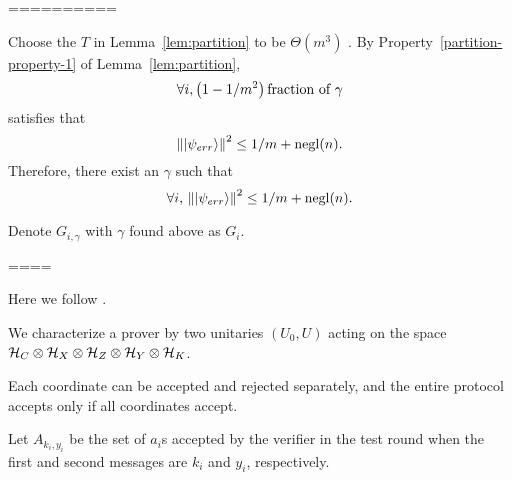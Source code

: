 \fi
==========

Choose the $T$ in Lemma~\ref{lem:partition} to be $\Theta(m^3)$ . By Property~\ref{partition-property-1} of Lemma~\ref{lem:partition}, 
$$\forall i, \left(1- 1/m^2\right)\text{fraction of }\gamma$$ 
satisfies that 
$$\left\lVert\ket{\psi_{err}}\right\rVert^2 \leq 1/m+\operatorname{negl}(n). $$
Therefore, there exist an $\gamma$ such that 
$$\forall i,\, \left\lVert\ket{\psi_{err}}\right\rVert^2 \leq 1/m+\operatorname{negl}(n). $$

Denote $G_{i,\gamma}$ with  $\gamma$ found above as $G_i$. 

====





Here we follow \cite{parallelrep}.

We characterize a prover by two unitaries $(U_0, U)$ acting on the space $\mathcal{H}_C\otimes\mathcal{H}_X\otimes\mathcal{H}_Z\otimes\mathcal{H}_Y\otimes\mathcal{H}_K$.


Each coordinate can be accepted and rejected separately, and the entire protocol accepts only if all coordinates accept.

Let $A_{k_i, y_i}$ be the set of $a_i$s accepted by the verifier in the test round when the first and second messages are $k_i$ and $y_i$, respectively.





